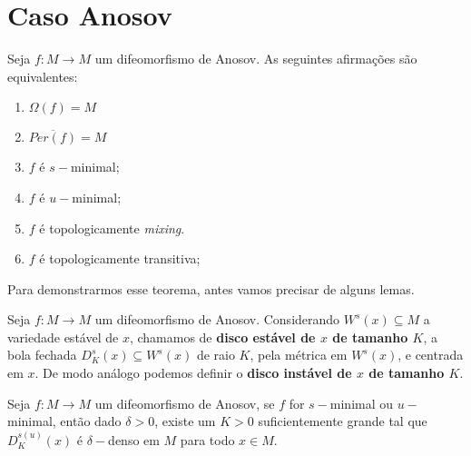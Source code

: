

\chapter{Caso Anosov}

\begin{teorema}\label{TeoEquivMinimal}
Seja $f : M \to M$ um difeomorfismo de Anosov. As seguintes afirmações são equivalentes:
\begin{enumerate}[\hspace{0.5cm}i)]
\item $\Omega(f)=M$
\item $\overline{Per(f)}=M$
\item $f$ é $s-$minimal;
\item $f$ é $u-$minimal;
\item $f$ é topologicamente \textit{mixing}.
\item $f$ é topologicamente transitiva;
\end{enumerate}
\end{teorema}

Para demonstrarmos esse teorema, antes vamos precisar de alguns lemas.


\begin{definicao} Seja $f:M\to M$ um difeomorfismo de Anosov. Considerando $W^{s}(x)\subseteq M$ a variedade estável de $x$, chamamos de \textbf{disco estável de $x$ de tamanho $K$}, a bola fechada $D_K^{s}(x)\subseteq W^{s}(x)$ de raio $K$, pela métrica em $W^{s}(x)$, e centrada em $x$. De modo análogo podemos definir o \textbf{disco instável de $x$ de tamanho $K$}.
\end{definicao}

\begin{lema}\label{lemadeltadenso} Seja $f:M\to M$ um difeomorfismo de Anosov, se $f$ for $s-$minimal ou $u-$minimal, então dado $\delta>0$, existe um $K>0$ suficientemente grande tal que $D_K^{s(u)}(x)$ é $\delta-$denso em $M$ para todo $x\in M$.
\end{lema}

